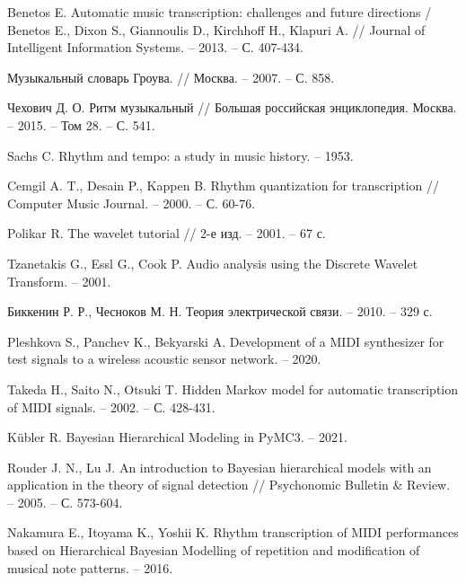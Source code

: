 
\begingroup
\renewcommand{\section}[2]{}
\begin{thebibliography}{}
	
Benetos E. Automatic music transcription: challenges and future directions / Benetos E., Dixon S., Giannoulis D., Kirchhoff H., Klapuri A. // Journal of Intelligent Information Systems. -- 2013. -- С. 407-434.

Музыкальный словарь Гроува. // Москва. -- 2007. -- С. 858.

Чехович Д. О. Ритм музыкальный // Большая российская энциклопедия. Москва. -- 2015. -- Том 28. -- С. 541.

Sachs C. Rhythm and tempo: a study in music history. -- 1953.

Cemgil A. T., Desain P., Kappen B. Rhythm quantization for transcription // Computer Music Journal. -- 2000. -- С. 60-76.

Polikar R. The wavelet tutorial // 2-е изд. -- 2001. -- 67 с.

Tzanetakis G., Essl G., Cook P. Audio analysis using the Discrete Wavelet Transform. -- 2001.

Биккенин Р. Р., Чесноков М. Н. Теория электрической связи. -- 2010. -- 329 с.

Pleshkova S., Panchev K., Bekyarski A. Development of a MIDI synthesizer for test signals to a wireless acoustic sensor network. -- 2020.

Takeda H., Saito N., Otsuki T. Hidden Markov model for automatic transcription of MIDI signals. -- 2002. -- С. 428-431.

Kübler R. Bayesian Hierarchical Modeling in PyMC3. -- 2021.

Rouder J. N., Lu J. An introduction to Bayesian hierarchical models with an application in the theory of signal detection // Psychonomic Bulletin \& Review. -- 2005. -- С. 573-604.

Nakamura E., Itoyama K., Yoshii K. Rhythm transcription of MIDI performances based on Hierarchical Bayesian Modelling of repetition and modification of musical note patterns. -- 2016.


\end{thebibliography}
